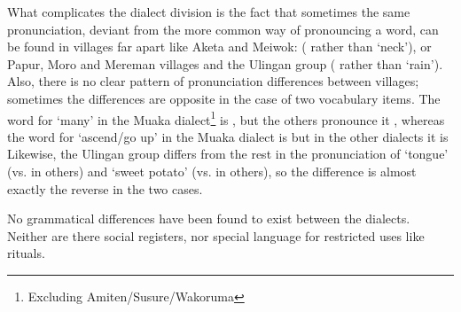What complicates the dialect division is the fact that sometimes the same pronunciation, deviant from the more common way of pronouncing a word, can be found in villages far apart like Aketa and Meiwok: ( rather than  `neck'), or Papur,  Moro and Mereman villages and the Ulingan group ( rather than  `rain'). Also, there is no clear pattern of pronunciation differences between villages; sometimes the differences are opposite in the case of two vocabulary items. The word for `many' in the Muaka dialect\footnote{Excluding Amiten/Susure/Wakoruma} is , but the others pronounce it , whereas the word for `ascend/go up' in the Muaka dialect is \emphs but in the other dialects it is  Likewise, the Ulingan group differs from the rest in the pronunciation of  `tongue' (vs.  in others) and  `sweet potato' (vs.  in others), so the difference is almost exactly the reverse in the two cases.  

No grammatical differences have been found to exist between the dialects.  Neither are there social registers, nor special language for restricted uses like rituals. 

